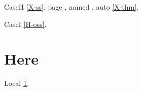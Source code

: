 \documentclass{article}
\begin{document}
CaseH \ref{X-ss}, page \pageref{X-front}, named ,
auto \autoref{X-thm}.

CaseI \ref{H-oss}.

\section{Here}\label{here}
Local \ref{here}.
\end{document}
